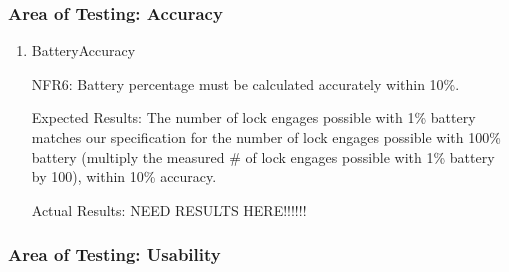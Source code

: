 \documentclass[12pt, titlepage]{article}
\begin{document}
\subsubsection{Area of Testing: Accuracy}

\begin{enumerate}

\item{BatteryAccuracy

NFR6: Battery percentage must be calculated accurately within 10\%. }

Expected Results: The number of lock engages possible with 1\% battery matches our specification for the number of lock engages possible with 100\% battery (multiply the measured \# of lock engages possible with 1\% battery by 100), within 10\% accuracy.

Actual Results: NEED RESULTS HERE!!!!!!

\end{enumerate}

\subsubsection{Area of Testing: Usability}
\end{document}
